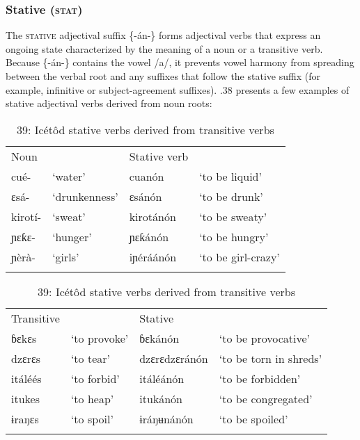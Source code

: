 \begin{table}
\subsubsection{Stative (\textsc{stat})}

The \textsc{stative }adjectival suffix \{-án-\} forms adjectival verbs that express an ongoing state characterized by the meaning of a noun or a transitive verb. Because \{-án-\} contains the vowel /a/, it prevents vowel harmony from spreading between the verbal root and any suffixes that follow the stative suffix (for example, infinitive or subject-agreement suffixes). .38 presents a few examples of stative adjectival verbs derived from noun roots:


\begin{table}
\caption{38: Icétôd stative verbs derived from nouns}
\label{tab:8}


\begin{tabularx}{\textwidth}{XXXX}
\lsptoprule

Noun &  & Stative verb & \\
cué- & ‘water’ & cuanón & ‘to be liquid’\\
ɛsá- & ‘drunkenness’ & ɛsánón & ‘to be drunk’\\
kirotí- & ‘sweat’ & kirotánón & ‘to be sweaty’\\
ɲɛƙɛ{}- & ‘hunger’ & ɲɛƙánón & ‘to be hungry’\\
ɲèrà- & ‘girls’ & iɲéráánón & ‘to be girl-crazy’\\
\lspbottomrule
\end{tabularx}
\end{table}
\begin{stylelsTable}%
\begin{table}
\caption{39 gives a few stative verbs derived from transitive verbs:}
\label{tab:8}
\end{stylelsTable}


\begin{table}
\caption{39: Icétôd stative verbs derived from transitive verbs}
\label{tab:8}


\begin{tabularx}{\textwidth}{XXXX}
\lsptoprule

Transitive &  & Stative & \\
ɓɛkɛs & ‘to provoke’ & ɓɛkánón & ‘to be provocative’\\
dzɛrɛs & ‘to tear’ & dzɛrɛdzɛránón & ‘to be torn in shreds’\\
itáléés & ‘to forbid’ & itáléánón & ‘to be forbidden’\\
itukes & ‘to heap’ & itukánón & ‘to be congregated’\\
ɨraŋɛs & ‘to spoil’ & ɨráŋʉnánón & ‘to be spoiled’\\
\lspbottomrule
\end{tabularx}
\end{table}


\end{table}
